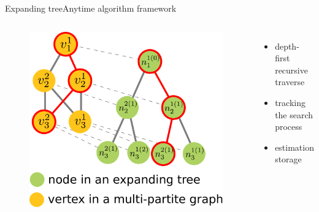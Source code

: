 \begin{frame}{Expanding tree}{Anytime algorithm framework}

\begin{columns}

\begin{minipage}{\textwidth}
\begin{figure}
\centering
\includegraphics[width=.9\textwidth]{./figure/multipartite_expandingtree}
\end{figure}
\end{minipage}

\begin{minipage}{\textwidth}
\begin{itemize}
\item depth-first recursive traverse
\item tracking the search process
\item estimation storage
\end{itemize}
\end{minipage}

\end{columns}

\end{frame}

